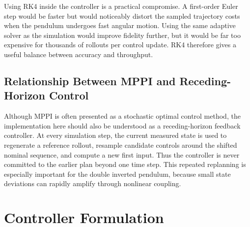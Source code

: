 \documentclass[conference]{IEEEtran}
\begin{document}
Using RK4 inside the controller is a practical compromise. A first-order Euler step would be faster but would noticeably distort the sampled trajectory costs when the pendulum undergoes fast angular motion. Using the same adaptive solver as the simulation would improve fidelity further, but it would be far too expensive for thousands of rollouts per control update. RK4 therefore gives a useful balance between accuracy and throughput.

\subsection{Relationship Between MPPI and Receding-Horizon Control}
Although MPPI is often presented as a stochastic optimal control method, the implementation here should also be understood as a receding-horizon feedback controller. At every simulation step, the current measured state is used to regenerate a reference rollout, resample candidate controls around the shifted nominal sequence, and compute a new first input. Thus the controller is never committed to the earlier plan beyond one time step. This repeated replanning is especially important for the double inverted pendulum, because small state deviations can rapidly amplify through nonlinear coupling.

\section{Controller Formulation}
\end{document}
